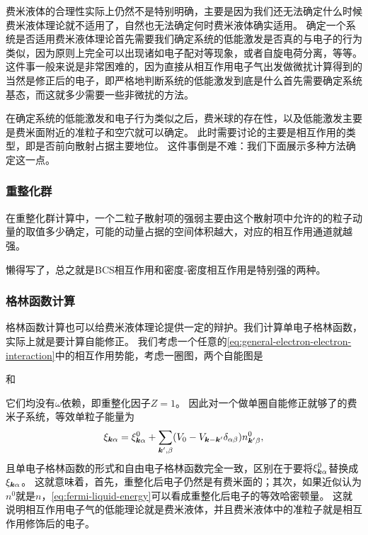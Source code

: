 费米液体的合理性实际上仍然不是特别明确，主要是因为我们还无法确定什么时候费米液体理论就不适用了，自然也无法确定何时费米液体确实适用。
确定一个系统是否适用费米液体理论首先需要我们确定系统的低能激发是否真的与电子的行为类似，因为原则上完全可以出现诸如电子配对等现象，或者自旋电荷分离，等等。
这件事一般来说是非常困难的，因为直接从相互作用电子气出发做微扰计算得到的当然是修正后的电子，即严格地判断系统的低能激发到底是什么首先需要确定系统基态，而这就多少需要一些非微扰的方法。

在确定系统的低能激发和电子行为类似之后，费米球的存在性，以及低能激发主要是费米面附近的准粒子和空穴就可以确定。
此时需要讨论的主要是相互作用的类型，即是否前向散射占据主要地位。
这件事倒是不难：我们下面展示多种方法确定这一点。

\subsubsection{重整化群}

在重整化群计算中，一个二粒子散射项的强弱主要由这个散射项中允许的的粒子动量的取值多少确定，可能的动量占据的空间体积越大，对应的相互作用通道就越强。

懒得写了，总之就是BCS相互作用和密度-密度相互作用是特别强的两种。

\subsubsection{格林函数计算}

格林函数计算也可以给费米液体理论提供一定的辩护。我们计算单电子格林函数，实际上就是要计算自能修正。
我们考虑一个任意的\eqref{eq:general-electron-electron-interaction}中的相互作用势能，考虑一圈图，两个自能图是

和

它们均没有$\omega$依赖，即重整化因子$Z=1$。
因此对一个做单圈自能修正就够了的费米子系统，等效单粒子能量为
\begin{equation}
    \xi_{\vb*{k} \alpha} = \xi^0_{\vb*{k} \alpha} + \sum_{\vb*{k}', \beta} (V_0 - V_{\vb*{k} - \vb*{k}'} \delta_{\alpha \beta}) n_{\vb*{k}' \beta}^0,
\end{equation}
且单电子格林函数的形式和自由电子格林函数完全一致，区别在于要将$\xi^0_{\vb*{k} \alpha}$替换成$\xi_{\vb*{k} \alpha}$。
这就意味着，首先，重整化后电子仍然是有费米面的；其次，如果近似认为$n^0$就是$n$，\eqref{eq:fermi-liquid-energy}可以看成重整化后电子的等效哈密顿量。
这就说明相互作用电子气的低能理论就是费米液体，并且费米液体中的准粒子就是相互作用修饰后的电子。

